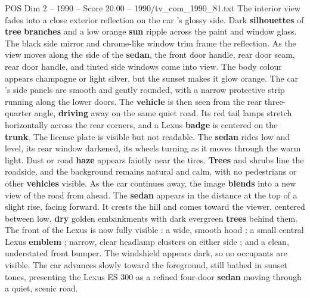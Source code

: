 \begin{textsample}{POS Dim 2 – 1990 – Score 20.00 – 1990/tv\_com\_1990\_81.txt}
The interior view fades into a close exterior reflection on the car ’s glossy side.
Dark \textbf{silhouettes} of \textbf{tree} \textbf{branches} and a low orange \textbf{sun} ripple across the paint and window glass.
The black side mirror and chrome-like window trim frame the reflection.
As the view moves along the side of the \textbf{sedan}, the front door handle, rear door seam, rear door handle, and tinted side windows come into view.
The body colour appears champagne or light silver, but the sunset makes it glow orange.
The car ’s side panels are smooth and gently rounded, with a narrow protective strip running along the lower doors.
The \textbf{vehicle} is then seen from the rear three-quarter angle, \textbf{driving} away on the same quiet road.
Its red tail lamps stretch horizontally across the rear corners, and a Lexus \textbf{badge} is centered on the \textbf{trunk}.
The license plate is visible but not readable.
The \textbf{sedan} rides low and level, its rear window darkened, its wheels turning as it moves through the warm light.
Dust or road \textbf{haze} appears faintly near the tires. \textbf{Trees} and shrubs line the roadside, and the background remains natural and calm, with no pedestrians or other \textbf{vehicles} visible.
As the car continues away, the image \textbf{blends} into a new view of the road from ahead.
The \textbf{sedan} appears in the distance at the top of a slight rise, facing forward.
It crests the hill and comes toward the viewer, centered between low, \textbf{dry} golden embankments with dark evergreen \textbf{trees} behind them.
The front of the Lexus is now fully visible : a wide, smooth hood ; a small central Lexus \textbf{emblem} ; narrow, clear headlamp clusters on either side ; and a clean, understated front bumper.
The windshield appears dark, so no occupants are visible.
The car advances slowly toward the foreground, still bathed in sunset tones, presenting the Lexus ES 300 as a refined four-door \textbf{sedan} moving through a quiet, scenic road.

\end{textsample}
